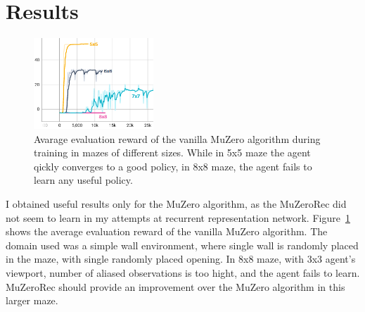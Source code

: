 \documentclass[12pt]{article}
\begin{document}
\section{Results}
\begin{figure}
  \centering
  \includegraphics[width=0.4\textwidth]{MuZero_learning.png}
  \caption{Avarage evaluation reward of the vanilla MuZero algorithm during training in mazes of different sizes. While in 5x5 maze the agent qickly converges to a good policy, in 8x8 maze, the agent fails to learn any useful policy.}
  \label{fig:MuZero_learning}
\end{figure}
I obtained useful results only for the MuZero algorithm, as the MuZeroRec did not seem to learn in my attempts at recurrent representation network. Figure~\ref{fig:MuZero_learning} shows the average evaluation reward of the vanilla MuZero algorithm. The domain used was a simple wall environment, where single wall is randomly placed in the maze, with single randomly placed opening.
In 8x8 maze, with 3x3 agent's viewport, number of aliased observations is too hight, and the agent fails to learn.
MuZeroRec should provide an improvement over the MuZero algorithm in this larger maze. 
\end{document}
